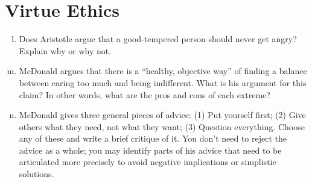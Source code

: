 \documentclass{article}
\begin{document}
\section*{Virtue Ethics}
\begin{enumerate}[a)]
  \setcounter{enumi}{11}
  \item Does Aristotle argue that a good-tempered person should never get angry? Explain why or why not.
  \item McDonald argues that there is a ``healthy, objective way'' of finding a balance between caring too much and being indifferent. What is his argument for this claim? In other words, what are the pros and cons of each extreme?
  \item McDonald gives three general pieces of advice: (1) Put yourself first; (2) Give others what they need, not what they want; (3) Question everything. Choose any of these and write a brief critique of it. You don’t need to reject the advice as a whole; you may identify parts of his advice that need to be articulated more precisely to avoid negative implications or simplistic solutions.
\end{enumerate}
\end{document}
